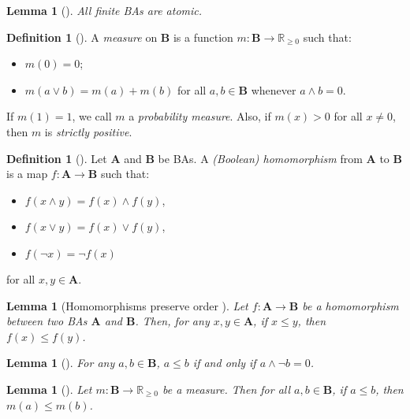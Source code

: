 \documentclass{article}
\newtheorem{lemma}[theorem]{Lemma}
\theoremstyle{definition}
\newtheorem{definition}[theorem]{Definition}
\theoremstyle{remark}
\begin{document}
\begin{lemma}[\cite{givant2008introduction}] \label{lemma:atomic}
  All finite BAs are atomic.
\end{lemma}

\begin{definition}[\cite{gaifman1964concerning,DBLP:books/daglib/0090259}] \label{def:measure}
  A \emph{measure} on $\mathbf{B}$ is a function $m\colon
  \mathbf{B} \to \mathbb{R}_{\ge 0}$ such that:
  \begin{itemize}
  \item $m(0) = 0$;
  \item $m(a \lor b) = m(a) + m(b)$ for all $a, b \in \mathbf{B}$ whenever $a
    \land b = 0$.
  \end{itemize}
  If $m(1) = 1$, we call $m$ a \emph{probability measure}. Also, if $m(x) > 0$
  for all $x \ne 0$, then $m$ is \emph{strictly positive}.
\end{definition}

\begin{definition}[\cite{givant2008introduction}]
  Let $\mathbf{A}$ and $\mathbf{B}$ be BAs. A \emph{(Boolean) homomorphism} from
  $\mathbf{A}$ to $\mathbf{B}$ is a map $f\colon \mathbf{A} \to \mathbf{B}$ such
  that:
  \begin{itemize}
  \item $f(x \land y) = f(x) \land f(y)$,
  \item $f(x \lor y) = f(x) \lor f(y)$,
  \item $f(\neg x) = \neg f(x)$
  \end{itemize}
  for all $x, y \in \mathbf{A}$.
\end{definition}

\begin{lemma}[Homomorphisms preserve order
  \cite{givant2008introduction}] \label{lemma:homomorphisms_and_order}
  Let $f\colon \mathbf{A} \to \mathbf{B}$ be a homomorphism between two BAs
  $\mathbf{A}$ and $\mathbf{B}$. Then, for any $x, y \in \mathbf{A}$, if $x \le
  y$, then $f(x) \le f(y)$.
\end{lemma}

\begin{lemma}[\cite{sikorski1969boolean}] \label{lemma:order}
  For any $a, b \in \mathbf{B}$, $a \le b$ if and only if $a \land \neg b = 0$.
\end{lemma}

\begin{lemma}[\cite{givant2008introduction}] \label{lemma:measure_and_order}
  Let $m\colon \mathbf{B} \to \mathbb{R}_{\ge 0}$ be a measure. Then for all $a,
  b \in \mathbf{B}$, if $a \le b$, then $m(a) \le m(b)$.
\end{lemma}
\end{document}
